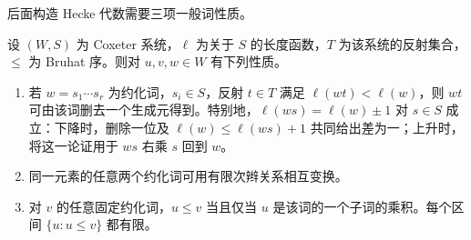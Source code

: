 \ProseParagraphBreak
后面构造 Hecke 代数需要三项一般词性质。
\begin{theorem}[交换性质与子词判据]\label{b5:thm:coxeter-word-properties}
	设 \((W,S)\) 为 Coxeter 系统，\(\ell\) 为关于 \(S\) 的长度函数，\(T\) 为该系统的反射集合，\(\le\) 为 Bruhat 序。则对 \(u,v,w\in W\) 有下列性质。
	\begin{enumerate}
		\item 若 \(w=s_1\cdots s_r\) 为约化词，\(s_i\in S\)，反射 \(t\in T\) 满足 \(\ell(wt)<\ell(w)\)，则 \(wt\) 可由该词删去一个生成元得到。特别地，\(\ell(ws)=\ell(w)\pm1\) 对 \(s\in S\) 成立：下降时，删除一位及 \(\ell(w)\le\ell(ws)+1\) 共同给出差为一；上升时，将这一论证用于 \(ws\) 右乘 \(s\) 回到 \(w\)。
		\item 同一元素的任意两个约化词可用有限次辫关系相互变换。
		\item 对 \(v\) 的任意固定约化词，\(u\le v\) 当且仅当 \(u\) 是该词的一个子词的乘积。每个区间 \(\{u:u\le v\}\) 都有限。
	\end{enumerate}
\end{theorem}
